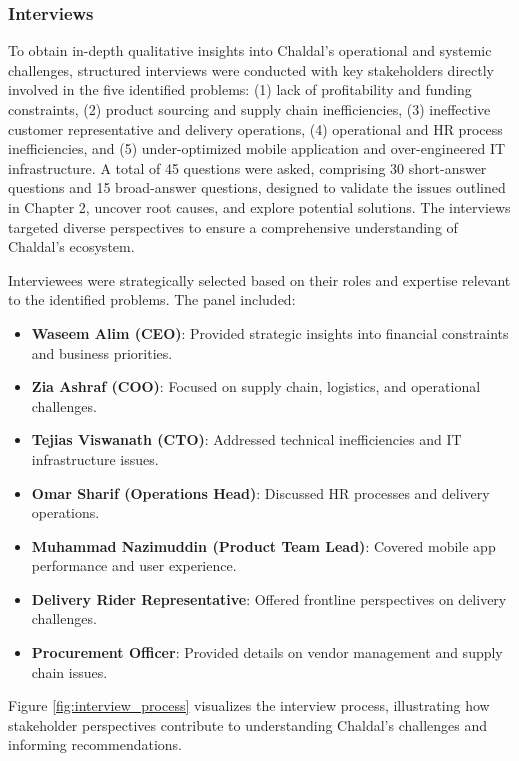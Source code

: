 \documentclass[12pt,a4paper]{article}
\begin{document}
\subsubsection{Interviews}
To obtain in-depth qualitative insights into Chaldal’s operational and systemic challenges, structured interviews were conducted with key stakeholders directly involved in the five identified problems: (1) lack of profitability and funding constraints, (2) product sourcing and supply chain inefficiencies, (3) ineffective customer representative and delivery operations, (4) operational and HR process inefficiencies, and (5) under-optimized mobile application and over-engineered IT infrastructure. A total of 45 questions were asked, comprising 30 short-answer questions and 15 broad-answer questions, designed to validate the issues outlined in Chapter 2, uncover root causes, and explore potential solutions. The interviews targeted diverse perspectives to ensure a comprehensive understanding of Chaldal’s ecosystem.

Interviewees were strategically selected based on their roles and expertise relevant to the identified problems. The panel included:
\begin{itemize}
    \item \textbf{Waseem Alim (CEO)}: Provided strategic insights into financial constraints and business priorities.
    \item \textbf{Zia Ashraf (COO)}: Focused on supply chain, logistics, and operational challenges.
    \item \textbf{Tejias Viswanath (CTO)}: Addressed technical inefficiencies and IT infrastructure issues.
    \item \textbf{Omar Sharif (Operations Head)}: Discussed HR processes and delivery operations.
    \item \textbf{Muhammad Nazimuddin (Product Team Lead)}: Covered mobile app performance and user experience.
    \item \textbf{Delivery Rider Representative}: Offered frontline perspectives on delivery challenges.
    \item \textbf{Procurement Officer}: Provided details on vendor management and supply chain issues.
\end{itemize}

Figure \ref{fig:interview_process} visualizes the interview process, illustrating how stakeholder perspectives contribute to understanding Chaldal’s challenges and informing recommendations.
\end{document}
